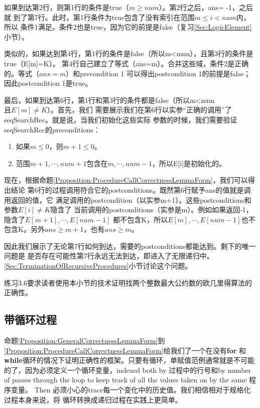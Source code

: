 \begin{algorithm}
如果到达第2行，则第1行的条件是true（$m \geq num$）。第2行之后，ans= -1，之后就
到了第7行。此时，第1行条件为true包含了没有索引在范围$m \leq i < num$内，所以
条件1满足。条件2也是true，因为它的前提是false（复习\ref{Sec:LogicElement}小节）。

类似的，如果达到第4行，第1行的条件是false（所以m<num），且第3行的条件是true（E[m]=K）。
第4行自己建立了等式（ans=m）。合并这些域，条件2是正确的。等式（$ans=m$）和precondition 1
可以得出postcondition 1的前提是false；因此postcondition 1是true。

最后，如果到达第6行，第1行和第3行的条件都是false（所以m<num$且E[m]\neq K$）。首先，我们
需要展示我们在第6行以实参“正确的调用”了seqSearchRec。就是说，当我们初始化这些实际
参数的时候，我们需要验证seqSearchRec的preconditions：
\begin{enumerate}
\item 如果$m \leq 0$，则$m+1 \leq 0$。
\item 范围$m+1, \cdots, num+1$包含在$m, \cdots, num-1$，所以E[i]是初始化的。
\end{enumerate}
现在，根据命题\ref{Proposition:ProcedureCallCorrectnessLemmaForm}，我们可以得出结论
第6行的过程调用符合它的postconditions。既然第6行赋予ans的值就是调用返回的值，它
满足调用的postcondition（以实参m+1）。这些postconditions和参数$E[i]\neq K$隐含了
当前调用的postconditions（实参是m）。例如如果返回-1，隐含了$E[m+1], \cdots, E[num-1]$
都不包含K，所以$E[m], \cdots, E[num-1]$也不包含K。另外$ans \geq m+1$，也有$ans \geq m$。

因此我们展示了无论第7行如何到达，需要的postconditions都能达到。剩下的唯一问题是
是否存在可能性第7行永远无法到达，即进入了无限递归中。
\ref{Sec:TerminationOfRecursiveProcedures}小节讨论这个问题。
\end{algorithm}

练习3.6要求读者使用本小节的技术证明找两个整数最大公约数的欧几里得算法的正确性。

\subsection{带循环过程}\label{Sec:ProceduresWithLoop}
命题\ref{Proposition:GeneralCorrectnessLemmaForm}到
\ref{Proposition:ProcedureCallCorrectnessLemmaForm}给我们了一个在没有\textbf{for}
和\textbf{while}循环的情况下证明正确性的框架。只要有循环，单赋值范例通常就是不可能
的了，因为必须定义一个循环变量，indexed both by 过程中的行号和by number of passes
 through the loop to keep track of all the values taken on by the same 程序变量。
Then 必须小心的trace每一个变化中的历史值。我们相信相对于规格化过程本身来说，将
循环转换成递归过程在实践上更简单。

